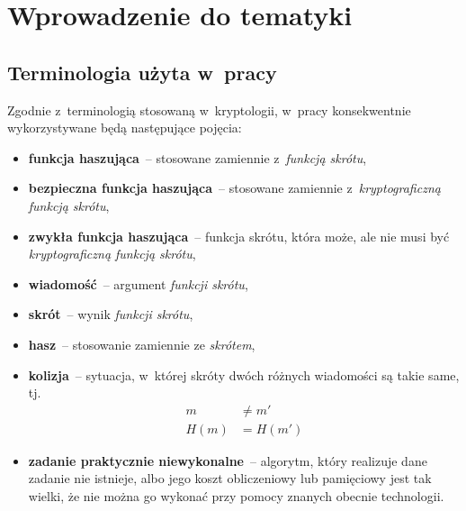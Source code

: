 \section{Wprowadzenie do tematyki}



\subsection{Terminologia użyta w~pracy}
Zgodnie z~terminologią stosowaną w~kryptologii, w~pracy konsekwentnie
wykorzystywane będą następujące pojęcia:

\begin{itemize}

    \item \textbf{funkcja haszująca}~-- stosowane zamiennie z~\emph{funkcją
    skrótu},

    \item \textbf{bezpieczna funkcja haszująca}~-- stosowane zamiennie
    z~\emph{kryptograficzną funkcją skrótu},

    \item \textbf{zwykła funkcja haszująca}~-- funkcja skrótu, która może, ale
    nie musi być \emph{kryptograficzną funkcją skrótu},

    \item \textbf{wiadomość}~-- argument \emph{funkcji skrótu},

    \item \textbf{skrót}~-- wynik \emph{funkcji skrótu},

    \item \textbf{hasz}~-- stosowanie zamiennie ze \emph{skrótem},

    \item \textbf{kolizja}~-- sytuacja, w~której skróty dwóch różnych
    wiadomości są takie same, tj.
    \[
        \begin{aligned}
        m &\neq m' \\
        H(m) &= H(m')
        \end{aligned}
    \]

    \item \textbf{zadanie praktycznie niewykonalne}~-- algorytm, który
    realizuje dane zadanie nie istnieje, albo jego koszt obliczeniowy lub
    pamięciowy jest tak wielki, że nie można go wykonać przy pomocy znanych
    obecnie technologii.

\end{itemize}



